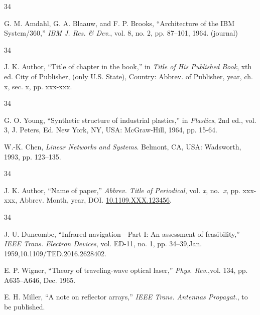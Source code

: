 \documentclass{IEEEjmw}
\begin{document}
\def\refname{}
\begin{thebibliography}{34}\vspace*{-12pt}

\bibitem{[1]} G. M. Amdahl, G. A. Blaauw, and F. P. Brooks, ``Architecture of the IBM System/360,'' {\em IBM J. Res. \& Dev.}, vol. 8, no. 2, pp. 87--101, 1964. (journal)
\end{thebibliography}

\vspace*{-12pt}
\def\refname{}
\begin{thebibliography}{34}
\item[]\hskip-18pt J. K. Author, ``Title of chapter in the book,'' in {\em Title of His Published Book}, xth ed. City of Publisher, (only U.S. State), Country: Abbrev. of Publisher, year, ch. x, sec. x, pp. xxx-xxx.
\end{thebibliography}\vspace*{-12pt}

\def\refname{}
\begin{thebibliography}{34}\vspace*{-12pt}

\bibitem{}G. O. Young, ``Synthetic structure of industrial plastics,'' in {\em Plastics}, 2nd ed., vol. 3, J. Peters, Ed. New York, NY, USA: McGraw-Hill, 1964, pp. 15-64.

\bibitem{}W.-K. Chen, {\it Linear Networks and Systems}. Belmont, CA, USA: Wadsworth, 1993, pp. 123--135.

\end{thebibliography}

\vspace*{-12pt}

\begin{thebibliography}{34}
\item[]\hskip-18pt
J. K. Author, ``Name of paper,'' {\it Abbrev. Title of Periodical}, vol. {\it x},   no.~{\it x}, pp. xxx-xxx, Abbrev. Month, year, DOI. \href{https://dx.doi.org/10.1109.XXX.123456}{10.1109.XXX.123456}.
\end{thebibliography}\vspace*{-12pt}


\vspace*{-12pt}

\begin{thebibliography}{34}
\setcounter{enumiv}{2}

\bibitem{}J. U. Duncombe, ``Infrared navigation---Part I: An assessment of feasibility,'' {\em IEEE Trans. Electron Devices}, vol. ED-11, no. 1, pp. 34--39,\break Jan. 1959,10.1109/TED.2016.2628402.

\bibitem{}E. P. Wigner, ``Theory of traveling-wave optical laser,''
{\em Phys. Rev.},\break  vol. 134, pp. A635--A646, Dec. 1965. %

\bibitem{}E. H. Miller, ``A note on reflector arrays,'' {\em IEEE Trans. Antennas Propagat.}, to be published.
\end{thebibliography}
\end{document}
